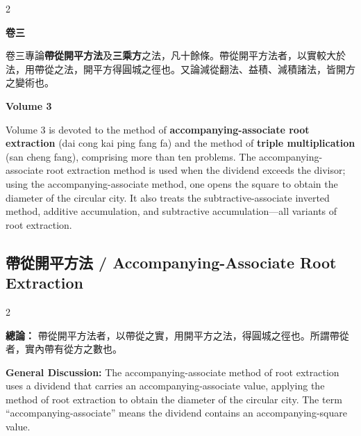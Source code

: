 \documentclass[11pt,a4paper]{article}
\newcounter{problem}[section]
\begin{document}
\begin{paracol}{2}

\noindent\textbf{卷三}

\smallskip

卷三專論\textbf{帶從開平方法}及\textbf{三乘方}之法，凡十餘條。帶從開平方法者，以實較大於法，用帶從之法，開平方得圓城之徑也。又論減從翻法、益積、減積諸法，皆開方之變術也。

\switchcolumn

\noindent\textbf{Volume 3}

\smallskip

Volume 3 is devoted to the method of \textbf{accompanying-associate root extraction} (dai cong kai ping fang fa) and the method of \textbf{triple multiplication} (san cheng fang), comprising more than ten problems. The accompanying-associate root extraction method is used when the dividend exceeds the divisor; using the accompanying-associate method, one opens the square to obtain the diameter of the circular city. It also treats the subtractive-associate inverted method, additive accumulation, and subtractive accumulation---all variants of root extraction.

\end{paracol}

\bigskip

\subsection*{帶從開平方法 / Accompanying-Associate Root Extraction}

\begin{paracol}{2}

\noindent\textbf{總論：} 帶從開平方法者，以帶從之實，用開平方之法，得圓城之徑也。所謂帶從者，實內帶有從方之數也。

\switchcolumn

\noindent\textbf{General Discussion:} The accompanying-associate method of root extraction uses a dividend that carries an accompanying-associate value, applying the method of root extraction to obtain the diameter of the circular city. The term ``accompanying-associate'' means the dividend contains an accompanying-square value.

\end{paracol}
\end{document}
